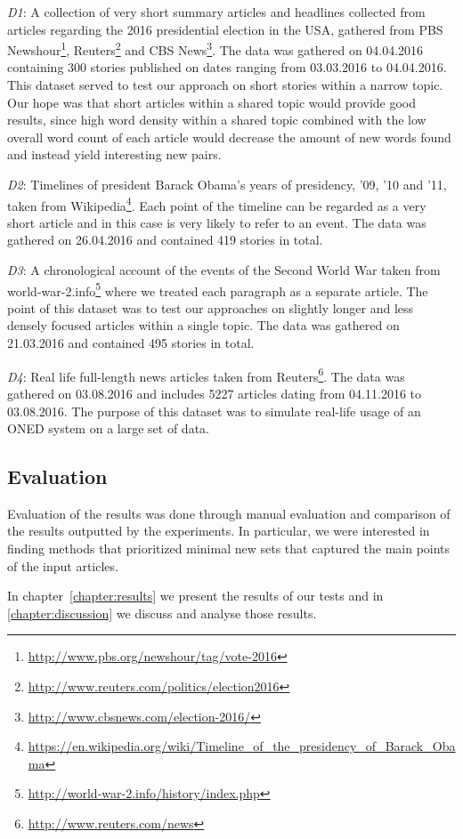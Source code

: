 \emph{D1}: A collection of very short summary articles and headlines collected from articles regarding the 2016 presidential election in the USA, gathered from PBS Newshour\footnote{\url{http://www.pbs.org/newshour/tag/vote-2016}}, Reuters\footnote{\url{http://www.reuters.com/politics/election2016}} and CBS News\footnote{\url{http://www.cbsnews.com/election-2016/}}. The data was gathered on 04.04.2016 containing 300 stories published on dates ranging from 03.03.2016 to 04.04.2016. This dataset served to test our approach on short stories within a narrow topic. Our hope was that short articles within a shared topic would provide good results, since high word density within a shared topic combined with the low overall word count of each article would decrease the amount of new words found and instead yield interesting new pairs.

\emph{D2}: Timelines of president Barack Obama's years of presidency, '09, '10 and '11, taken from Wikipedia\footnote{\url{https://en.wikipedia.org/wiki/Timeline_of_the_presidency_of_Barack_Obama}}. Each point of the timeline can be regarded as a very short article and in this case is very likely to refer to an event. The data was gathered on 26.04.2016 and contained 419 stories in total.

\emph{D3}: A chronological account of the events of the Second World War taken from world-war-2.info\footnote{\url{http://world-war-2.info/history/index.php}} where we treated each paragraph as a separate article. The point of this dataset was to test our approaches on slightly longer and less densely focused articles within a single topic. The data was gathered on 21.03.2016 and contained 495 stories in total.

\emph{D4}: Real life full-length news articles taken from Reuters\footnote{\url{http://www.reuters.com/news}}. The data was gathered on 03.08.2016 and includes 5227 articles dating from 04.11.2016 to 03.08.2016. The purpose of this dataset was to simulate real-life usage of an ONED system on a large set of data.

\subsection{Evaluation}
Evaluation of the results was done through manual evaluation and comparison of the results outputted by the experiments. In particular, we were interested in finding methods that prioritized minimal new sets that captured the main points of the input articles. 


In chapter~\ref{chapter:results} we present the results of our tests and in \cref{chapter:discussion} we discuss and analyse those results.
